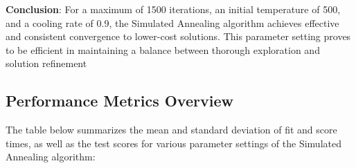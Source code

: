 \documentclass[
]{article}
\begin{document}
    \textbf{Conclusion}: For a maximum of 1500 iterations, an initial temperature of 500, and a cooling rate of 0.9, the Simulated Annealing algorithm achieves effective and consistent convergence to lower-cost solutions. This parameter setting proves to be efficient in maintaining a balance between thorough exploration and solution refinement

    \subsection{Performance Metrics Overview}

    The table below summarizes the mean and standard deviation of fit and score times, as well as the test scores for various parameter settings of the Simulated Annealing algorithm:

    \begin{table}[H]
        \centering
\end{table}
\end{document}
